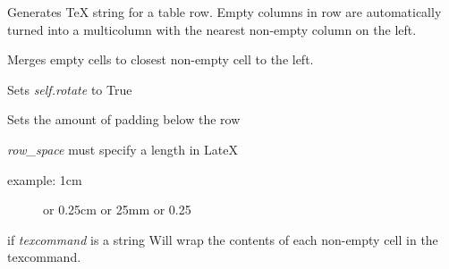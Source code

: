 \documentclass[letterpaper,10pt,english]{sphinxmanual}
\begin{document}
\begin{fulllineitems}
\begin{fulllineitems}
\end{fulllineitems}


\begin{fulllineitems}
\label{summary:tablemaker.Row.makeTex}
Generates TeX string for a table row. Empty columns in row
are automatically turned into a multicolumn with the nearest
non-empty column on the left.

\end{fulllineitems}


\begin{fulllineitems}
\label{summary:tablemaker.Row.mergeEmpty}
Merges empty cells to closest non-empty cell to the left.

\end{fulllineitems}


\begin{fulllineitems}
\label{summary:tablemaker.Row.rotateContents}
Sets \emph{self.rotate} to True

\end{fulllineitems}


\begin{fulllineitems}
\label{summary:tablemaker.Row.setBottomSpacing}
Sets the amount of padding below
the row

\emph{row\_space} must specify a length in LateX
\begin{description}
\item[{example:    1cm}] \leavevmode
or
0.25cm
or 
25mm
or
0.25

\end{description}

\end{fulllineitems}


\begin{fulllineitems}
\label{summary:tablemaker.Row.setFormat}
if \emph{texcommand} is a string
Will wrap the contents of each non-empty cell in the texcommand.


\end{fulllineitems}
\end{fulllineitems}
\end{document}
